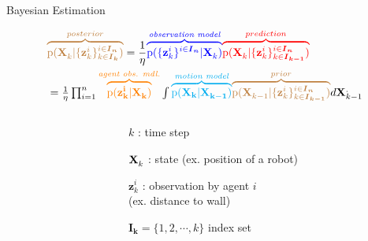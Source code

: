\documentclass{beamer}
\newcommand{\vect}{\bf}
\theoremstyle{remark}
\newcommand{\XX}[3][2]{\mathbf{X}_{\tiny #2}^{\tiny #3}}
\newcommand{\pr}{\textrm{p}}
\newcommand{\bIn}{\boldsymbol{I}_{\boldsymbol{n}}}
\newcommand{\bIk}{\boldsymbol{I}_{\boldsymbol{k}}}
\newcommand{\bIkk}{\boldsymbol{I}_{\boldsymbol{k-1}}}
\newcommand{\zz}[3][2]{\mathbf{z}_{ #2}^{ #3}}
\begin{document}
\begin{frame}{Bayesian Estimation}
	
				\begin{align*}
				& {\color{brown}\overbrace{\textstyle \pr(\XX[]{k}{}|\{\zz{k}{i}\}^{i\in\bIn}_{k\in\bIk}) }^{posterior}}  = \frac{1}{\eta}  
				{\color{blue}\overbrace{\pr(\{\zz{k}{i}\}^{i\in\bIn}| \XX[]{k}{})}^{\textit{observation model}\textbf{}}}
				{\color{red}\overbrace{\pr(\XX[]{k}{}|\{\zz{k}{i}\}^{i\in\bIn}_{k\in\bIkk})}^{prediction}} \\
				&\textstyle = \frac{1}{\eta}\prod_{i=1}^{n} 
				{\color{orange}\overbrace{\pr(\vect{z}_{k}^i | \XX[]{k}{})}^{\textit{agent obs. mdl.}}} \int {\color{cyan}\overbrace{\pr(\vect{X}_{k} | \XX[]{k-1}{})}^{\textit{motion model}}} {\color{brown}\overbrace{\pr(\XX[]{k-1}{}|\{\zz{k}{i}\}^{i\in\bIn}_{k\in\bIkk})}^{prior}}d\XX[]{k-1}.
				\end{align*}	
	\centering
	\begin{columns}
		\begin{column}{.48\textwidth}
		\end{column}
		
		\begin{column}{.48\textwidth}
			$k$ : time step
			
			$\XX[]{k}{}$ : state (ex. position of a robot)
			
			$\zz{k}{i}$ : observation by agent $i$ \\(ex. distance to wall)
			
			 $\bIk = \{1,2,\cdots,k\}$ index set
			

\end{column}
\end{columns}
\end{frame}
\end{document}
